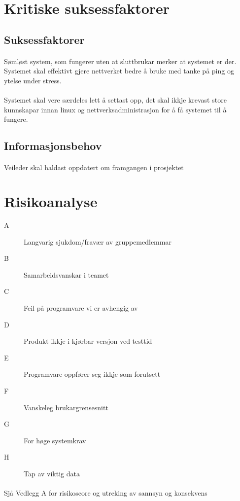 \documentclass[nynorsk,12pt,a4paper]{article}
\begin{document}
\newpage
\section{Kritiske suksessfaktorer}
\subsection{Suksessfaktorer}
\paragraph{}
Sømløst system, som fungerer uten at sluttbrukar merker at systemet er der. Systemet skal effektivt gjere nettverket bedre å bruke med tanke på ping og ytelse under stress. 
\paragraph{}
Systemet skal vere særdeles lett å settast opp, det skal ikkje krevast store kunnskapar innan linux og nettverksadministrasjon for å få systemet til å fungere.

\subsection{Informasjonsbehov}
\paragraph{}
Veileder skal haldast oppdatert om framgangen i prosjektet

\newpage
\section{Risikoanalyse}
\begin{description}
	\item[A] Langvarig sjukdom/fravær av gruppemedlemmar
	\item[B] Samarbeidsvanskar i teamet
	\item[C] Feil på programvare vi er avhengig av
	\item[D] Produkt ikkje i kjørbar versjon ved testtid
	\item[E] Programvare oppfører seg ikkje som forutsett
	\item[F] Vanskeleg brukargrensesnitt
	\item[G] For høge systemkrav
	\item[H] Tap av viktig data
\end{description}
\paragraph{}
Sjå Vedlegg A for risikoscore og utreking av sannsyn og konsekvens
\end{document}
